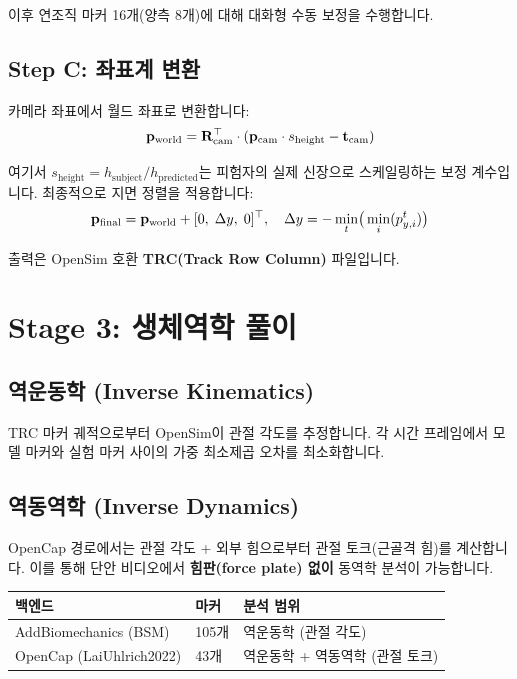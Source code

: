 \documentclass[11pt, a4paper]{report}
\begin{document}
이후 연조직 마커 16개(양측 8개)에 대해 대화형 수동 보정을 수행합니다.

\subsection{Step C: 좌표계 변환}

카메라 좌표에서 월드 좌표로 변환합니다:
\begin{equation}
\mathbf{p}_{\text{world}} = \mathbf{R}_{\text{cam}}^\top \cdot (\mathbf{p}_{\text{cam}} \cdot s_{\text{height}} - \mathbf{t}_{\text{cam}})
\end{equation}

여기서 $s_{\text{height}} = h_{\text{subject}} / h_{\text{predicted}}$는 피험자의 실제 신장으로 스케일링하는 보정 계수입니다. 최종적으로 지면 정렬을 적용합니다:
\begin{equation}
\mathbf{p}_{\text{final}} = \mathbf{p}_{\text{world}} + [0,\; \Delta y,\; 0]^\top, \quad \Delta y = -\min_t\!\big(\min_i(p_{y,i}^t)\big)
\end{equation}

출력은 OpenSim 호환 \textbf{TRC(Track Row Column)} 파일입니다.


\section{Stage 3: 생체역학 풀이}

\subsection{역운동학 (Inverse Kinematics)}

TRC 마커 궤적으로부터 OpenSim이 관절 각도를 추정합니다. 각 시간 프레임에서 모델 마커와 실험 마커 사이의 가중 최소제곱 오차를 최소화합니다.

\subsection{역동역학 (Inverse Dynamics)}

OpenCap 경로에서는 관절 각도 + 외부 힘으로부터 관절 토크(근골격 힘)를 계산합니다. 이를 통해 단안 비디오에서 \textbf{힘판(force plate) 없이} 동역학 분석이 가능합니다.

\begin{center}
\renewcommand{\arraystretch}{1.2}
\begin{tabular}{lll}
\toprule
\textbf{백엔드} & \textbf{마커} & \textbf{분석 범위} \\
\midrule
AddBiomechanics (BSM) & 105개 & 역운동학 (관절 각도) \\
OpenCap (LaiUhlrich2022) & 43개 & 역운동학 + 역동역학 (관절 토크) \\
\bottomrule
\end{tabular}
\end{center}
\end{document}
